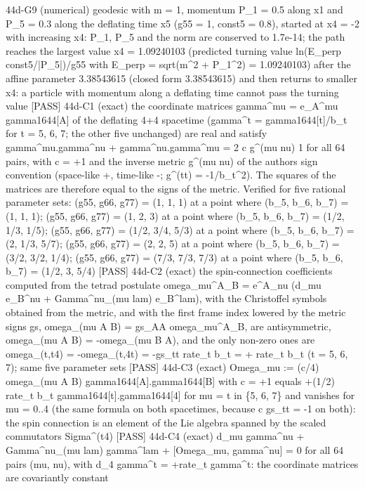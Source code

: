 \documentclass[
  10pt,
]{article}
\newenvironment{Shaded}{}{}
\newcommand{\NormalTok}[1]{#1}
\begin{document}
\begin{Shaded}
\begin{Highlighting}[]
\NormalTok{[PASS] 44d{-}G9  (numerical) geodesic with m = 1, momentum P\_1 = 0.5 along x1 and P\_5 = 0.3 along the deflating time x5 (g55 = 1, const5 = 0.8), started at x4 = {-}2 with increasing x4: P\_1, P\_5 and the norm are conserved to 1.7e{-}14; the path reaches the largest value x4 = 1.09240103 (predicted turning value ln(E\_perp const5/|P\_5|)/g55 with E\_perp = sqrt(m\^{}2 + P\_1\^{}2) = 1.09240103) after the affine parameter 3.38543615 (closed form 3.38543615) and then returns to smaller x4: a particle with momentum along a deflating time cannot pass the turning value}
\NormalTok{[PASS] 44d{-}C1  (exact) the coordinate matrices gamma\^{}mu = e\_A\^{}mu gamma1644[A] of the deflating 4+4 spacetime (gamma\^{}t = gamma1644[t]/b\_t for t = 5, 6, 7; the other five unchanged) are real and satisfy gamma\^{}mu.gamma\^{}nu + gamma\^{}nu.gamma\^{}mu = 2 c g\^{}(mu nu) 1 for all 64 pairs, with c = +1 and the inverse metric g\^{}(mu nu) of the author\textquotesingle{}s sign convention (space{-}like +, time{-}like {-}; g\^{}(tt) = {-}1/b\_t\^{}2). The squares of the matrices are therefore equal to the signs of the metric. Verified for five rational parameter sets: (g55, g66, g77) = (1, 1, 1) at a point where (b\_5, b\_6, b\_7) = (1, 1, 1); (g55, g66, g77) = (1, 2, 3) at a point where (b\_5, b\_6, b\_7) = (1/2, 1/3, 1/5); (g55, g66, g77) = (1/2, 3/4, 5/3) at a point where (b\_5, b\_6, b\_7) = (2, 1/3, 5/7); (g55, g66, g77) = (2, 2, 5) at a point where (b\_5, b\_6, b\_7) = (3/2, 3/2, 1/4); (g55, g66, g77) = (7/3, 7/3, 7/3) at a point where (b\_5, b\_6, b\_7) = (1/2, 3, 5/4)}
\NormalTok{[PASS] 44d{-}C2  (exact) the spin{-}connection coefficients computed from the tetrad postulate omega\_mu\^{}A\_B = e\^{}A\_nu (d\_mu e\_B\^{}nu + Gamma\^{}nu\_(mu lam) e\_B\^{}lam), with the Christoffel symbols obtained from the metric, and with the first frame index lowered by the metric signs gs, omega\_(mu A B) = gs\_AA omega\_mu\^{}A\_B, are antisymmetric, omega\_(mu A B) = {-}omega\_(mu B A), and the only non{-}zero ones are omega\_(t,t4) = {-}omega\_(t,4t) = {-}gs\_tt rate\_t b\_t = + rate\_t b\_t (t = 5, 6, 7); same five parameter sets}
\NormalTok{[PASS] 44d{-}C3  (exact) Omega\_mu := (c/4) omega\_(mu A B) gamma1644[A].gamma1644[B] with c = +1 equals +(1/2) rate\_t b\_t gamma1644[t].gamma1644[4] for mu = t in \{5, 6, 7\} and vanishes for mu = 0..4 (the same formula on both spacetimes, because c gs\_tt = {-}1 on both): the spin connection is an element of the Lie algebra spanned by the scaled commutators Sigma\^{}(t4)}
\NormalTok{[PASS] 44d{-}C4  (exact) d\_mu gamma\^{}nu + Gamma\^{}nu\_(mu lam) gamma\^{}lam + [Omega\_mu, gamma\^{}nu] = 0 for all 64 pairs (mu, nu), with d\_4 gamma\^{}t = +rate\_t gamma\^{}t: the coordinate matrices are covariantly constant}

\end{Highlighting}
\end{Shaded}
\end{document}
